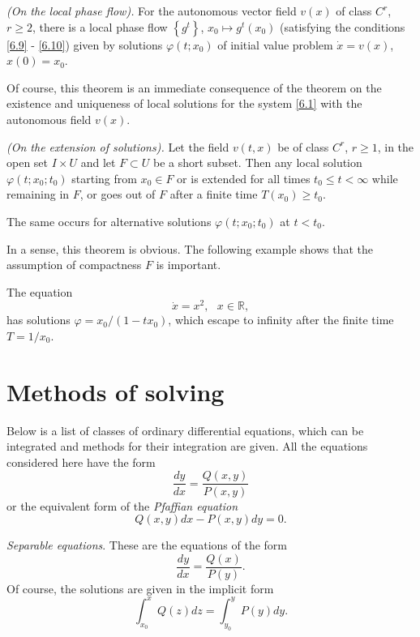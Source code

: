 \begin{theorem}\emph{(On the local phase flow).}
	For the autonomous vector field $v (x)$ of class $C^r$, $r \geq 2$, there is a local phase flow $\left\{ g^{t}\right\}$, $x_{0}\longmapsto g^{t}(x_{0})$ (satisfying the conditions \eqref{6.9} - \eqref{6.10}) given by solutions $\varphi (t;x_{0})$ of initial value problem $\dot{x}=v(x)$, $x(0)=x_{0}$.
\end{theorem}

Of course, this theorem is an immediate consequence of the theorem on the existence and uniqueness of local solutions for the system \eqref{6.1} with the autonomous field $v (x)$.

\begin{theorem}\emph{(On the extension of solutions).}
	Let the field $v (t, x)$ be of class $C^r$, $r \geq 1$, in the open set $I\times U$ and let $F\subset U$ be a short subset. Then any local solution $\varphi (t;x_{0};t_{0})$ starting from $x_{0}\in F$ or is extended for all times $t_{0}\leq t<\infty $ while remaining in $F$, or goes out of $F$ after a finite time $T(x_{0})\geq t_{0}$.
	
	The same occurs for alternative solutions $\varphi
	(t;x_{0};t_{0})$ at $t <t_0$.
\end{theorem}

In a sense, this theorem is obvious. The following example shows that the assumption of compactness $F$ is important.

\begin{example}
	The equation
	$$
	\dot{x}=x^{2},\text{ \ \ }x\in \mathbb{R},
	$$
	has solutions $\varphi =x_{0}/(1-tx_{0})$, which escape to infinity after the finite time $T=1/x_{0}.$
\end{example}

\section{Methods of solving}
Below is a list of classes of ordinary differential equations, which can be integrated and methods for their integration are given. All the equations considered here have the form
\begin{equation}
\label{6.16}
\frac{dy}{dx}=\frac{Q(x,y)}{P(x,y)}
\end{equation}
or the equivalent form of the \emph{Pfaffian equation}
$$
Q(x,y)dx-P(x,y)dy=0.
$$

\begin{example}
	\emph{Separable equations}. These are the equations of the form
	$$
	\frac{dy}{dx}=\frac{Q(x)}{P(y)}.
	$$
	Of course, the solutions are given in the implicit form
	$$
	\int_{x_{0}}^{x}Q(z)dz=\int_{y_{0}}^{y}P(y)dy.
	$$
\end{example}

